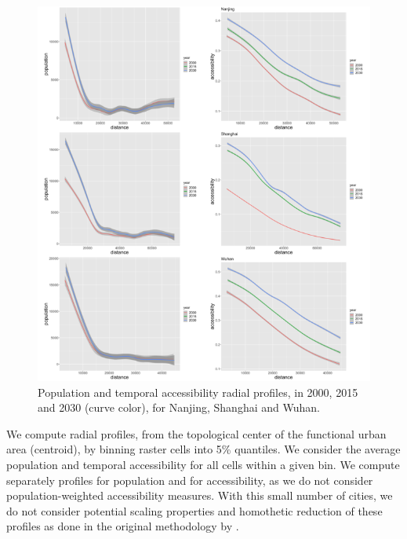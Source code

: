 \documentclass{article}
\begin{document}
\begin{figure}
	\includegraphics[width=\linewidth]{figures/Fig2b.png}
	\caption{Population and temporal accessibility radial profiles, in 2000, 2015 and 2030 (curve color), for Nanjing, Shanghai and Wuhan.\label{fig:fig4}}
\end{figure}

We compute radial profiles, from the topological center of the functional urban area (centroid), by binning raster cells into 5\% quantiles. We consider the average population and temporal accessibility for all cells within a given bin. We compute separately profiles for population and for accessibility, as we do not consider population-weighted accessibility measures. With this small number of cities, we do not consider potential scaling properties and homothetic reduction of these profiles as done in the original methodology by \cite{lemoy2020evidence}.
\end{document}
